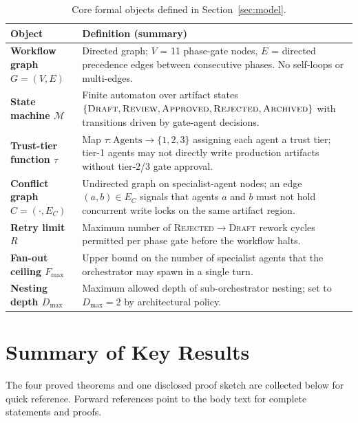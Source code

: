 \documentclass[12pt]{article}
\theoremstyle{definition}
\begin{document}
\begin{table}[H]
\centering
\caption{Core formal objects defined in Section~\ref{sec:model}.}
\label{tab:key-defs}
\begin{tabularx}{\linewidth}{@{}>{\bfseries}p{2.8cm} >{\RaggedRight\arraybackslash}X@{}}
\toprule
Object & Definition (summary) \\
\midrule
Workflow graph $G=(V,E)$ &
  Directed graph; $V$ = 11 phase-gate nodes, $E$ = directed
  precedence edges between consecutive phases.  No self-loops or
  multi-edges. \\[4pt]
State machine $\mathcal{M}$ &
  Finite automaton over artifact states
  $\{\textsc{Draft},\textsc{Review},\textsc{Approved},\textsc{Rejected},\textsc{Archived}\}$
  with transitions driven by gate-agent decisions. \\[4pt]
Trust-tier function $\tau$ &
  Map $\tau: \text{Agents} \to \{1,2,3\}$ assigning each agent a
  trust tier; tier-1 agents may not directly write
  production artifacts without tier-2/3 gate approval. \\[4pt]
Conflict graph $C=(\cdot,E_C)$ &
  Undirected graph on specialist-agent nodes; an edge $(a,b)\in E_C$
  signals that agents $a$ and $b$ must not hold concurrent write
  locks on the same artifact region. \\[4pt]
Retry limit $R$ &
  Maximum number of \textsc{Rejected}$\to$\textsc{Draft} rework
  cycles permitted per phase gate before the workflow halts. \\[4pt]
Fan-out ceiling $F_{\max}$ &
  Upper bound on the number of specialist agents that the orchestrator
  may spawn in a single turn. \\[4pt]
Nesting depth $D_{\max}$ &
  Maximum allowed depth of sub-orchestrator nesting; set to $D_{\max}=2$
  by architectural policy. \\
\bottomrule
\end{tabularx}
\end{table}

\section{Summary of Key Results}
\label{app:key-results}

\noindent The four proved theorems and one disclosed proof sketch are
collected below for quick reference.  Forward references point to the
body text for complete statements and proofs.
\end{document}
